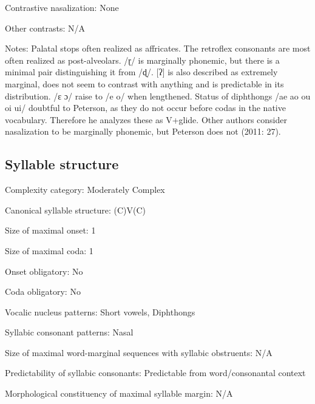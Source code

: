 {\begin{appendixdesc}
\item[Contrastive nasalization:] None

\item[Other contrasts:] N/A

\item[Notes:] Palatal stops often realized as affricates. The retroflex consonants are most often realized as post-alveolars. /ɽ/ is marginally phonemic, but there is a minimal pair distinguishing it from /ɖ/. [ʔ] is also described as extremely marginal, does not seem to contrast with anything and is predictable in its distribution. /ɛ ɔ/ raise to /e o/ when lengthened. Status of diphthongs /ae ao ou oi ui/ doubtful to Peterson, as they do not occur before codas in the native vocabulary. Therefore he analyzes these as V+glide. Other authors consider nasalization to be marginally phonemic, but Peterson does not (2011: 27).
\end{appendixdesc}
\subsection*{Syllable structure}
\begin{appendixdesc}

\item[Complexity category:] Moderately Complex

\item[Canonical syllable structure:] (C)V(C) \citep[32--33]{Peterson2011}

\item[Size of maximal onset:] 1

\item[Size of maximal coda:] 1

\item[Onset obligatory:] No

\item[Coda obligatory:] No

\item[Vocalic nucleus patterns:] Short vowels, Diphthongs

\item[Syllabic consonant patterns:] Nasal

\item[Size of maximal word-marginal sequences with syllabic obstruents:] N/A

\item[Predictability of syllabic consonants:] Predictable from word/consonantal context

\item[Morphological constituency of maximal syllable margin:] N/A


\end{appendixdesc}}

